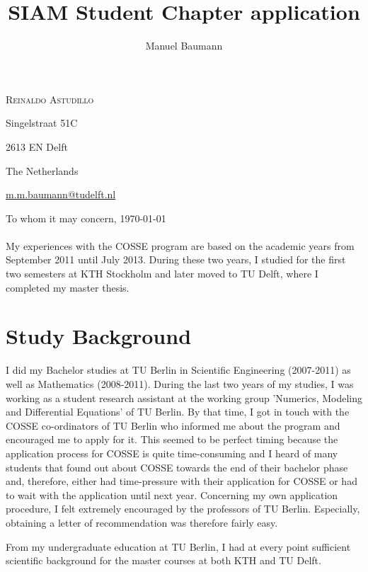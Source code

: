 \documentclass{article}
\title{\bf SIAM Student Chapter application }
\author{Manuel Baumann}
\begin{document}
\hfill \textsc{Reinaldo Astudillo}

\hfill Singelstraat 51C

\hfill 2613 EN Delft

\hfill The Netherlands

\hfill

\hfill \href{mailto:m.m.baumann@tudelft.nl}{m.m.baumann@tudelft.nl}


\vspace{2cm}

To whom it may concern, \hfill \today
\\ \\
My experiences with the COSSE program are based on the academic years from September 2011 until July 2013. During these two years, I studied for the first two semesters at KTH Stockholm and later moved to TU Delft, where I completed my master thesis.
\section*{Study Background}
I did my Bachelor studies at TU Berlin in Scientific Engineering (2007-2011) as well as Mathematics (2008-2011). During the last two years of my studies, I was working as a student research assistant at the working group 'Numerics, Modeling and Differential Equations' of TU Berlin. By that time, I got in touch with the COSSE co-ordinators of TU Berlin who informed me about the program and encouraged me to apply for it. This seemed to be perfect timing because the application process for COSSE is quite time-consuming and I heard of many students that found out about COSSE towards the end of their bachelor phase and, therefore, either had time-pressure with their application for COSSE or had to wait with the application until next year. Concerning my own application procedure, I felt extremely encouraged by the professors of TU Berlin. Especially, obtaining a letter of recommendation was therefore fairly easy.

From my undergraduate education at TU Berlin, I had at every point sufficient scientific background for the master courses at both KTH and TU Delft.
\end{document}
